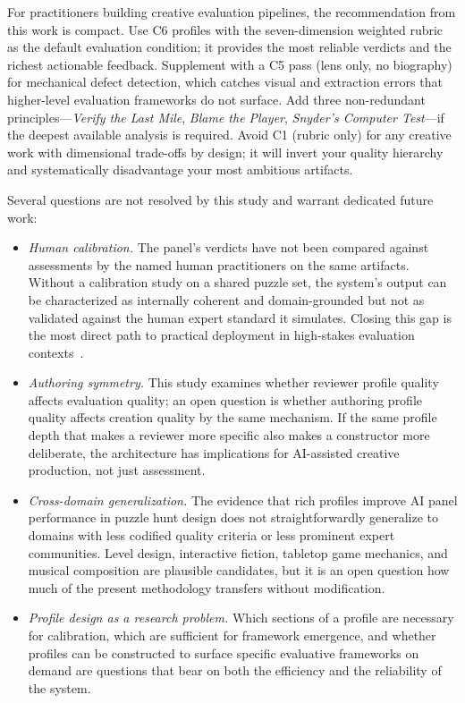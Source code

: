 For practitioners building creative evaluation pipelines, the recommendation from this work
is compact. Use C6 profiles with the seven-dimension weighted rubric as the default
evaluation condition; it provides the most reliable verdicts and the richest actionable
feedback. Supplement with a C5 pass (lens only, no biography) for mechanical defect
detection, which catches visual and extraction errors that higher-level evaluation frameworks
do not surface. Add three non-redundant principles---\emph{Verify the Last Mile},
\emph{Blame the Player}, \emph{Snyder's Computer Test}---if the deepest available analysis
is required. Avoid C1 (rubric only) for any creative work with dimensional trade-offs by design; it
will invert your quality hierarchy and systematically disadvantage your most ambitious
artifacts.

Several questions are not resolved by this study and warrant dedicated future work:

\begin{itemize}

\item \emph{Human calibration.} The panel's verdicts have not been compared against
assessments by the named human practitioners on the same artifacts. Without a calibration
study on a shared puzzle set, the system's output can be characterized as internally coherent
and domain-grounded but not as validated against the human expert standard it simulates.
Closing this gap is the most direct path to practical deployment in high-stakes evaluation
contexts~\cite[cf.][]{dellaLibera2025calibration}.

\item \emph{Authoring symmetry.} This study examines whether reviewer profile quality
affects evaluation quality; an open question is whether authoring profile quality affects
creation quality by the same mechanism. If the same profile depth that makes a reviewer
more specific also makes a constructor more deliberate, the architecture has implications
for AI-assisted creative production, not just assessment.

\item \emph{Cross-domain generalization.} The evidence that rich profiles improve AI panel
performance in puzzle hunt design does not straightforwardly generalize to domains with
less codified quality criteria or less prominent expert communities. Level design,
interactive fiction, tabletop game mechanics, and musical composition are plausible
candidates, but it is an open question how much of the present methodology transfers
without modification.

\item \emph{Profile design as a research problem.} Which sections of a profile are
necessary for calibration, which are sufficient for framework emergence, and whether
profiles can be constructed to surface specific evaluative frameworks on demand are
questions that bear on both the efficiency and the reliability of the system.

\end{itemize}

